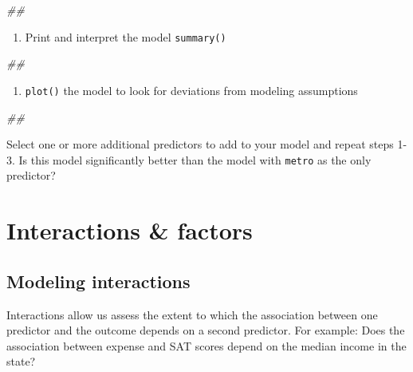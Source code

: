 \documentclass[]{book}
\newenvironment{Shaded}{\begin{snugshade}}{\end{snugshade}}
\newcommand{\CommentTok}[1]{\textcolor[rgb]{0.56,0.35,0.01}{\textit{#1}}}
\providecommand{\tightlist}{%
  \setlength{\itemsep}{0pt}\setlength{\parskip}{0pt}}
\begin{document}
\begin{Shaded}
\begin{Highlighting}[]
\CommentTok{## }
\end{Highlighting}
\end{Shaded}

\begin{enumerate}
\def\labelenumi{\arabic{enumi}.}
\setcounter{enumi}{1}
\tightlist
\item
  Print and interpret the model \texttt{summary()}
\end{enumerate}

\begin{Shaded}
\begin{Highlighting}[]
\CommentTok{## }
\end{Highlighting}
\end{Shaded}

\begin{enumerate}
\def\labelenumi{\arabic{enumi}.}
\setcounter{enumi}{2}
\tightlist
\item
  \texttt{plot()} the model to look for deviations from modeling assumptions
\end{enumerate}

\begin{Shaded}
\begin{Highlighting}[]
\CommentTok{## }
\end{Highlighting}
\end{Shaded}

Select one or more additional predictors to add to your model and repeat steps 1-3. Is this model significantly better than the model with \texttt{metro} as the only predictor?

\hypertarget{interactions-factors}{%
\section{Interactions \& factors}\label{interactions-factors}}

\hypertarget{modeling-interactions}{%
\subsection{Modeling interactions}\label{modeling-interactions}}

Interactions allow us assess the extent to which the association between one predictor and the outcome depends on a second predictor. For example: Does the association between expense and SAT scores depend on the median income in the state?
\end{document}
